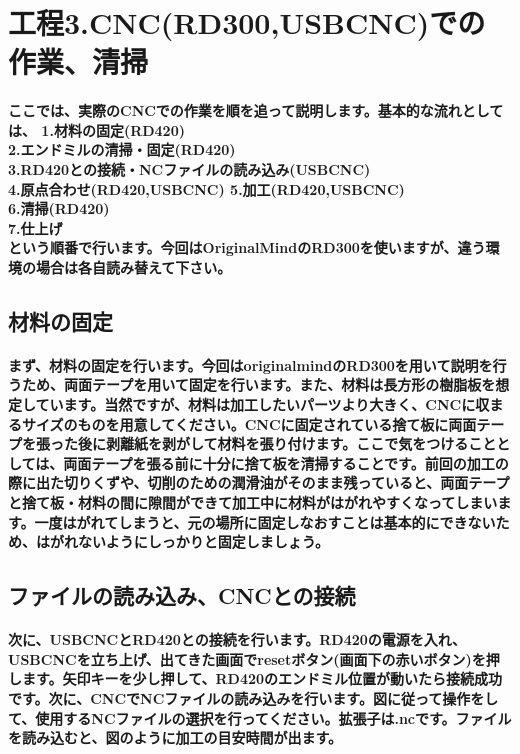 \documentclass[b5paper, 9pt, twocolumn, titlepage,openany]{jsbook}%
\begin{document}


\section{工程3.CNC(RD300,USBCNC)での作業、清掃}
\paragraph{ここでは、実際のCNCでの作業を順を追って説明します。基本的な流れとしては、
  1.材料の固定(RD420)\\
  2.エンドミルの清掃・固定(RD420)\\
  3.RD420との接続・NCファイルの読み込み(USBCNC)\\
  4.原点合わせ(RD420,USBCNC)
  5.加工(RD420,USBCNC)\\
  6.清掃(RD420)\\
  7.仕上げ\\
  という順番で行います。今回はOriginalMindのRD300を使いますが、違う環境の場合は各自読み替えて下さい。}
\subsection{材料の固定}
\paragraph{まず、材料の固定を行います。今回はoriginalmindのRD300を用いて説明を行うため、両面テープを用いて固定を行います。また、材料は長方形の樹脂板を想定しています。当然ですが、材料は加工したいパーツより大きく、CNCに収まるサイズのものを用意してください。CNCに固定されている捨て板に両面テープを張った後に剥離紙を剥がして材料を張り付けます。ここで気をつけることとしては、両面テープを張る前に十分に捨て板を清掃することです。前回の加工の際に出た切りくずや、切削のための潤滑油がそのまま残っていると、両面テープと捨て板・材料の間に隙間ができて加工中に材料がはがれやすくなってしまいます。一度はがれてしまうと、元の場所に固定しなおすことは基本的にできないため、はがれないようにしっかりと固定しましょう。}


\subsection{ファイルの読み込み、CNCとの接続}
\paragraph{次に、USBCNCとRD420との接続を行います。RD420の電源を入れ、USBCNCを立ち上げ、出てきた画面でresetボタン(画面下の赤いボタン)を押します。矢印キーを少し押して、RD420のエンドミル位置が動いたら接続成功です。次に、CNCでNCファイルの読み込みを行います。図に従って操作をして、使用するNCファイルの選択を行ってください。拡張子は.ncです。ファイルを読み込むと、図のように加工の目安時間が出ます。}
\end{document}
